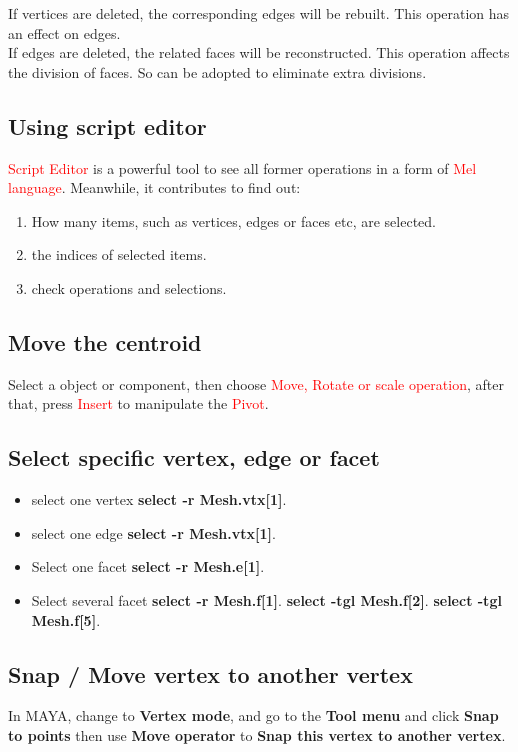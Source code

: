 If vertices are deleted, the corresponding edges will be rebuilt. This operation has an effect on edges.\\

If edges are deleted, the related faces will be reconstructed. This operation affects the division of faces. So can be adopted to eliminate extra divisions.

\subsection{Using script editor}
\textcolor{red}{Script Editor} is a powerful tool to see all former operations in a form of \textcolor{red}{Mel language}. Meanwhile, it contributes to find out:\\
\begin{enumerate}
	\item How many items, such as vertices, edges or faces etc, are selected.
	\item the indices of selected items.
	\item check operations and selections.
\end{enumerate}

\subsection{Move the centroid}
Select a object or component, then choose \textcolor{red}{Move, Rotate or scale operation}, after that, press \textcolor{red}{Insert} to manipulate the \textcolor{red}{Pivot}.

\subsection{Select specific vertex, edge or facet}
\begin{itemize}
	\item select one vertex
	\textbf{select -r Mesh.vtx[1]}.
	\item select one edge
	\textbf{select -r Mesh.vtx[1]}.
	\item Select one facet
	\textbf{select -r Mesh.e[1]}.
	\item Select several facet
	\textbf{select -r Mesh.f[1]}.
	\textbf{select -tgl Mesh.f[2]}.
	\textbf{select -tgl Mesh.f[5]}.
\end{itemize}

\subsection{Snap / Move vertex to another vertex}
In MAYA, change to \textbf{Vertex mode}, and go to the \textbf{Tool menu} and click \textbf{Snap to points} then use \textbf{Move operator} to \textbf{Snap this vertex to another vertex}.

